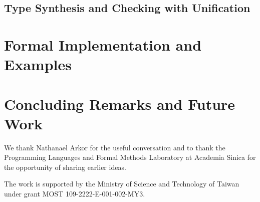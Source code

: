 \documentclass[acmsmall]{acmart}
\begin{document}
\subsection{Type Synthesis and Checking with Unification}

\section{Formal Implementation and Examples}

\citep{Xie2018}

\section{Concluding Remarks and Future Work}
\begin{acks}
We thank Nathanael Arkor for the useful conversation and to thank the Programming Languages and Formal Methods Laboratory at Academia Sinica for the opportunity of sharing earlier ideas.

The work is supported by the Ministry of Science and Technology of Taiwan under grant MOST 109-2222-E-001-002-MY3.
\end{acks}



\end{document}
